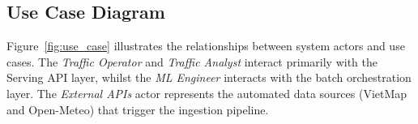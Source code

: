   \subsection{Use Case Diagram}                                                                                                                           
  \label{subsec:use_case_diagram}

  Figure~\ref{fig:use_case} illustrates the relationships between system                                                                                  
  actors and use cases. The \textit{Traffic Operator} and \textit{Traffic
  Analyst} interact primarily with the Serving API layer, whilst the                                                                                      
  \textit{ML Engineer} interacts with the batch orchestration layer.                                                                                      
  The \textit{External APIs} actor represents the automated data sources                                                                                  
  (VietMap and Open-Meteo) that trigger the ingestion pipeline.                                                                                           
                                                                                                                                                          
